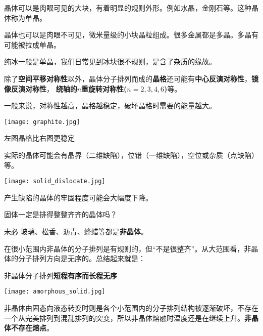 \documentclass[CJK]{beamer}
\begin{document}
\begin{frame}
\bch
\bitem
\item{晶体可以是肉眼可见的大块，有着明显的规则外形。例如水晶，金刚石等。这种晶体称为单晶。}
\item{晶体也可以是肉眼不可见，微米量级的小块晶粒组成。很多金属都是多晶。多晶有可能被拉成单晶。}
\item{纯冰一般是单晶，我们日常见到冰块很不规则，是含了杂质的缘故。}
\eitem
\ech
\end{frame}


\begin{frame}
\bch
除了{\bf 空间平移对称性}以外，晶体分子排列而成的{\bf 晶格}还可能有{\bf 中心反演对称性}，{\bf 镜像反演对称性}， {\bf 绕轴的$n$重旋转对称性($n=2,3,4,6$)}等。

一般来说，对称性越高，晶格越稳定，破坏晶格时需要的能量越大。

\bcenter
\texttt{[image: graphite.jpg]}
\ecenter

左图晶格比右图更稳定
\ech
\end{frame}


\begin{frame}
\bch
实际的晶体可能会有晶界（二维缺陷），位错（一维缺陷），空位或杂质（点缺陷）等。

\bcenter
\texttt{[image: solid\_dislocate.jpg]}
\ecenter

产生缺陷的晶体的牢固程度可能会大幅度下降。
\ech
\end{frame}


\begin{frame}
\bch
固体一定是排得整整齐齐的晶体吗？

\skiplines

未必 \bye 玻璃、松香、沥青、蜂蜡等都是{\bf 非晶体}。
\ech
\end{frame}

\begin{frame}
\bch
在很小范围内非晶体的分子排列是有规则的，但“不是很整齐”。从大范围看，非晶体的分子排列方向是无序的。总结起来就是：

非晶体分子排列{\bf 短程有序而长程无序}

\skipline
\texttt{[image: amorphous\_solid.jpg]}

非晶体由固态向液态转变时则是各个小范围内的分子排列结构被逐渐破坏，不存在一个从完美排列到混乱排列的突变，所以非晶体熔融时温度还是在继续上升。{\bf 非晶体不存在熔点}。

\ech
\end{frame}
\end{document}
